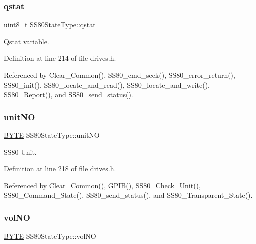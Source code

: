 \subsubsection{\texorpdfstring{qstat}{qstat}}
{\footnotesize\ttfamily uint8\+\_\+t S\+S80\+State\+Type\+::qstat}



Qstat variable. 



Definition at line 214 of file drives.\+h.



Referenced by Clear\+\_\+\+Common(), S\+S80\+\_\+cmd\+\_\+seek(), S\+S80\+\_\+error\+\_\+return(), S\+S80\+\_\+init(), S\+S80\+\_\+locate\+\_\+and\+\_\+read(), S\+S80\+\_\+locate\+\_\+and\+\_\+write(), S\+S80\+\_\+\+Report(), and S\+S80\+\_\+send\+\_\+status().

\mbox{\label{structSS80StateType_ad2b3cd5353f5650df931520a39b385e7}} 
\subsubsection{\texorpdfstring{unit\+NO}{unitNO}}
{\footnotesize\ttfamily \hyperlink{ff_8h_a4ae1dab0fb4b072a66584546209e7d58}{B\+Y\+TE} S\+S80\+State\+Type\+::unit\+NO}



S\+S80 Unit. 



Definition at line 218 of file drives.\+h.



Referenced by Clear\+\_\+\+Common(), G\+P\+I\+B(), S\+S80\+\_\+\+Check\+\_\+\+Unit(), S\+S80\+\_\+\+Command\+\_\+\+State(), S\+S80\+\_\+send\+\_\+status(), and S\+S80\+\_\+\+Transparent\+\_\+\+State().

\mbox{\label{structSS80StateType_ac197866db7677ec4bf9ad5e29e4a58a3}} 
\subsubsection{\texorpdfstring{vol\+NO}{volNO}}
{\footnotesize\ttfamily \hyperlink{ff_8h_a4ae1dab0fb4b072a66584546209e7d58}{B\+Y\+TE} S\+S80\+State\+Type\+::vol\+NO}



